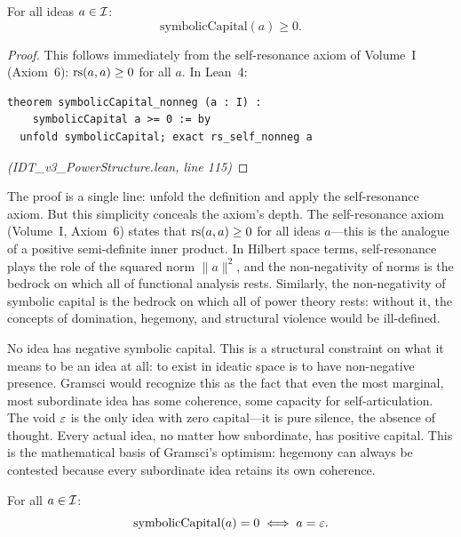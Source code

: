 \begin{theorem}
\label{thm:capital-nonneg}
For all ideas $a \in \mathcal{I}$:
\[
  \mathrm{symbolicCapital}(a) \geq 0.
\]
\end{theorem}

\begin{proof}
This follows immediately from the self-resonance axiom of Volume~I (Axiom~6):
$\mathrm{rs}(a,a) \geq 0$ for all $a$. In Lean~4:
\begin{lstlisting}
theorem symbolicCapital_nonneg (a : I) :
    symbolicCapital a >= 0 := by
  unfold symbolicCapital; exact rs_self_nonneg a
\end{lstlisting}
\textit{(IDT\_v3\_PowerStructure.lean, line 115)}
\end{proof}

\begin{remark}
The proof is a single line: unfold the definition and apply the self-resonance
axiom. But this simplicity conceals the axiom's depth. The self-resonance axiom
(Volume~I, Axiom~6) states that $\mathrm{rs}(a,a) \geq 0$ for all ideas $a$---this is
the analogue of a positive semi-definite inner product. In Hilbert space terms,
self-resonance plays the role of the squared norm $\|a\|^2$, and the
non-negativity of norms is the bedrock on which all of functional analysis rests.
Similarly, the non-negativity of symbolic capital is the bedrock on which all
of power theory rests: without it, the concepts of domination, hegemony, and
structural violence would be ill-defined.
\end{remark}

\begin{interpretation}
No idea has negative symbolic capital. This is a structural constraint on what
it means to be an idea at all: to exist in ideatic space is to have non-negative
presence. Gramsci would recognize this as the fact that even the most marginal,
most subordinate idea has some coherence, some capacity for self-articulation.
The void $\varepsilon$ is the only idea with zero capital---it is pure silence, the
absence of thought. Every actual idea, no matter how subordinate, has positive
capital. This is the mathematical basis of Gramsci's optimism: hegemony can
always be contested because every subordinate idea retains its own coherence.
\end{interpretation}

\begin{theorem}
\label{thm:zero-capital-void}
For all $a \in \mathcal{I}$:
\[
  \mathrm{symbolicCapital}(a) = 0 \iff a = \varepsilon.
\]
\end{theorem}

